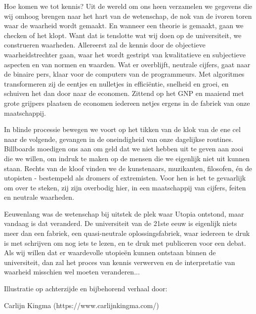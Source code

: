 Hoe komen we tot kennis? Uit de wereld om ons heen verzamelen we gegevens die wij omhoog brengen naar het hart van de wetenschap, de nok van de ivoren toren waar de waarheid wordt gemaakt. En wanneer een theorie is gemaakt, gaan we checken of het klopt. Want dat is tenslotte wat wij doen op de universiteit, we construeren waarheden. Allereerst zal de kennis door de objectieve waarheidstrechter gaan, waar het wordt gestript van kwalitatieve en subjectieve aspecten en van normen en waarden. Wat er overblijft, neutrale cijfers, gaat naar de binaire pers, klaar voor de computers van de programmeurs. Met algoritmes transformeren zij de eentjes en nulletjes in efficiëntie, snelheid en groei, en schuiven het dan door naar de economen. Zittend op het GNP en maaiend met grote grijpers plaatsen de economen iedereen netjes ergens in de fabriek van onze maatschappij.

In blinde processie bewegen we voort op het tikken van de klok van de ene cel naar de volgende, gevangen in de oneindigheid van onze dagelijkse routines. Billboards moedigen ons aan om geld dat we niet hebben uit te geven aan zooi die we willen, om indruk te maken op de mensen die we eigenlijk niet uit kunnen staan. Rechts van de kloof vinden we de kunstenaars, muzikanten, filosofen, én de utopisten - bestempeld als dromers of extremisten. Voor hen is het te gevaarlijk om over te steken, zij zijn overbodig hier, in een maatschappij van cijfers, feiten en neutrale waarheden.

Eeuwenlang was de wetenschap bij uitstek de plek waar Utopia ontstond, maar vandaag is dat veranderd. De universiteit van de 21ste eeuw is eigenlijk niets meer dan een fabriek, een quasi-neutrale oplossingsfabriek, waar iedereen te druk is met schrijven om nog iets te lezen, en te druk met publiceren voor een debat. Als wij willen dat er waardevolle utopieën kunnen ontstaan binnen de universiteit, dan zal het proces van kennis verwerven en de interpretatie van waarheid misschien wel moeten veranderen...

\vspace*{\fill}

Illustratie op achterzijde en bijbehorend verhaal door:

Carlijn Kingma (https://www.carlijnkingma.com/)

\newpage


% 

\setcounter{tocdepth}{1}
\tableofcontents
\thispagestyle{empty}

